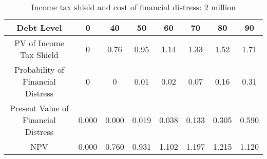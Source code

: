 \begin{table}[ht]
\centering
\begin{tabular}{@{}cccccccc@{}}
\toprule
Debt Level                          & 0     & 40    & 50    & 60    & 70    & 80    & 90    \\ \midrule
PV of Income Tax Shield             & 0     & 0.76  & 0.95  & 1.14  & 1.33  & 1.52  & 1.71  \\
Probability of Financial Distress   & 0     & 0     & 0.01  & 0.02  & 0.07  & 0.16  & 0.31  \\
Present Value of Financial Distress & 0.000 & 0.000 & 0.019 & 0.038 & 0.133 & 0.305 & 0.590 \\
NPV                                 & 0.000 & 0.760 & 0.931 & 1.102 & 1.197 & 1.215 & 1.120 \\ \bottomrule
\end{tabular}
\caption{Income tax shield and cost of financial distress: 2 million}
\label{tab:prob4-2mil}
\end{table}
